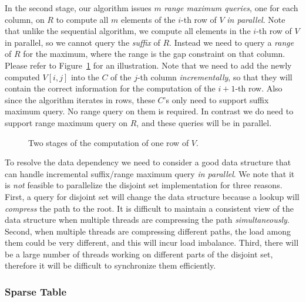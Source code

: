 In the second stage, our algorithm issues $m$ {\em range maximum
  queries}, one for each column, on $R$ to compute all $m$ elements of
the $i$-th row of $V$ {\em in parallel}.  Note that unlike the
sequential algorithm, we compute all elements in the $i$-th row of $V$
in parallel, so we cannot query the {\em suffix} of $R$.  Instead we
need to query a {\em range} of $R$ for the maximum, where the range is
the gap constraint on that column.  Please refer to
Figure~\ref{fig:fig-VGLCS-dp-rmq} for an illustration.  Note that we
need to add the newly computed $V[i, j]$ into the $C$ of the $j$-th
column {\em incrementally}, so that they will contain the correct
information for the computation of the $i+1$-th row.  Also since the
algorithm iterates in rows, these $C$'s only need to support suffix
maximum query.  No range query on them is required.  In contrast we do
need to support range maximum query on $R$, and these queries will be
in parallel.

\begin{figure}
  \centering {} 
  \caption{Two stages of the computation of one row of $V$.}
  \label{fig:fig-VGLCS-dp-rmq}
\end{figure}

To resolve the data dependency we need to consider a good data
structure that can handle incremental suffix/range maximum query {\em
  in parallel}.  We note that it is {\em not} feasible to parallelize
the disjoint set implementation for three reasons.  First, a query for
disjoint set will change the data structure because a lookup will {\em
  compress} the path to the root.  It is difficult to maintain a
consistent view of the data structure when multiple threads are
compressing the path {\em simultaneously}.  Second, when multiple
threads are compressing different paths, the load among them could be
very different, and this will incur load imbalance.  Third, there will
be a large number of threads working on different parts of the
disjoint set, therefore it will be difficult to synchronize them
efficiently.

\subsubsection{Sparse Table} \label{sec:sparse-table}

